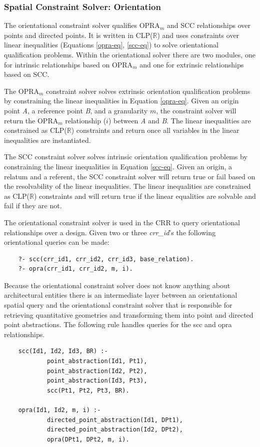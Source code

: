 \documentclass[12pt]{ucthesis}
\begin{document}
\subsubsection{Spatial Constraint Solver: Orientation}
The orientational constraint solver qualifies OPRA$_{m}$ and SCC relationships over points and directed points. It is written in CLP($\mathbb{R}$) and uses constraints over linear inequalities (Equations \ref{opra-eq}, \ref{scc-eq}) to solve orientational qualification problems. Within the orientational solver there are two modules, one for intrinsic relationships based on OPRA$_{m}$ and one for extrinsic relationships based on SCC.

The OPRA$_{m}$ constraint solver solves extrinsic orientation qualification problems by constraining the linear inequalities in Equation \ref{opra-eq}. Given an origin point \emph{A}, a reference point \emph{B}, and a granularity $m$, the constraint solver will return the OPRA$_{m}$ relationship ($i$) between \emph{A} and \emph{B}. The linear inequalities are constrained as CLP($\mathbb{R}$) constraints and return once all variables in the linear inequalities are instantiated. 

The SCC constraint solver solves intrinsic orientation qualification problems by constraining the linear inequalities in Equation \ref{scc-eq}. Given an origin, a relatum and a referent, the SCC constraint solver will return true or fail based on the resolvability of the linear inequalities. The linear inequalities are constrained as CLP($\mathbb{R}$) constraints and will return true if the linear equalities are solvable and fail if they are not.

The orientational constraint solver is used in the CRR to query orientational relationships over a design. Given two or three \emph{crr\_id}'s the following orientational queries can be made: 
\begin{verbatim}
    ?- scc(crr_id1, crr_id2, crr_id3, base_relation).
    ?- opra(crr_id1, crr_id2, m, i).
\end{verbatim} Because the orientational constraint solver does not know anything about architectural entities there is an intermediate layer between an orientational spatial query and the orientational constraint solver that is responsible for retrieving quantitative geometries and transforming them into point and directed point abstractions. The following rule handles queries for the scc and opra relationships.
\begin{verbatim}
    scc(Id1, Id2, Id3, BR) :-
            point_abstraction(Id1, Pt1),
            point_abstraction(Id2, Pt2),
            point_abstraction(Id3, Pt3),
            scc(Pt1, Pt2, Pt3, BR).

    opra(Id1, Id2, m, i) :-
            directed_point_abstraction(Id1, DPt1),
            directed_point_abstraction(Id2, DPt2),
            opra(DPt1, DPt2, m, i).
\end{verbatim}
\end{document}

